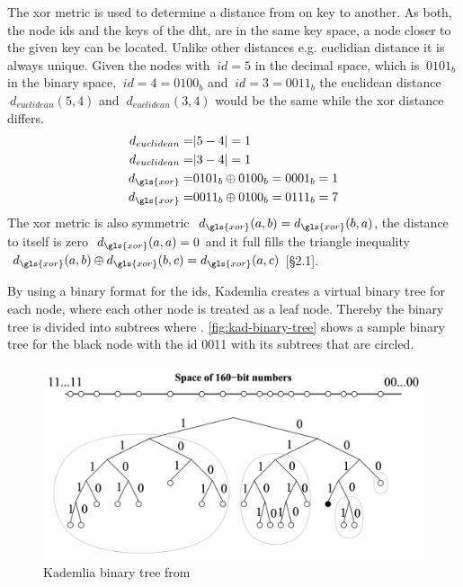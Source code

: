 The \gls{xor} metric is used to determine a distance from on key to another. As both, the node ids and the keys of the \gls{dht}, are in the same key space, a node closer to the given key can be located. Unlike other distances e.g. euclidian distance it is always unique.
Given the nodes with $\ id = 5 $ in the decimal space, which is  $\ 0101_{b} $ in the binary space, $\ id = 4 = 0100_{b} $ and $\ id = 3 = 0011_{b} $ the euclidean distance $\ d_{euclidean}(5,4) $ and $\ d_{euclidean}(3,4) $ would be the same while the xor distance differs.
\begin{equation}
\begin{aligned}  
    d_ {euclidean} = & | 5-4 | = 1\\
    d_ {euclidean} = & | 3-4 | = 1\\
    d_ {\gls{xor}} = & 0101_{b} \oplus 0100_{b} = 0001_{b} = 1\\
    d_ {\gls{xor}} = & 0011_{b} \oplus 0100_{b} = 0111_{b} = 7\\
  \end{aligned}  
\end{equation}
The \gls{xor} metric is also symmetric $\ d_{\gls{xor}}(a,b) = d_{\gls{xor}}(b,a) $, the distance to itself is zero $\ d_{\gls{xor}}(a,a) = 0 $ and it full fills the triangle inequality $\ d_{\gls{xor}}(a,b) \oplus d_{\gls{xor}}(b,c) = d_{\gls{xor}}(a,c) $ \cite{kademlia}[\S2.1].

By using a binary format for the ids, Kademlia creates a virtual binary tree for each node, where each other node is treated as a leaf node. Thereby the binary tree is divided into subtrees where  \cite[\S2]{kademlia}.
\vref{fig:kad-binary-tree} shows a sample binary tree for the black node with the id 0011 with its subtrees that are circled.

\begin{figure}
\centering
\includegraphics[width=1\textwidth]{graphics/kademlia-binary-tree.png}
\caption{Kademlia binary tree from \cite[\S2]{kademlia}}
\label{fig:kad-binary-tree}
\end{figure}

